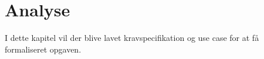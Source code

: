 \chapter{Analyse}

I dette kapitel vil der blive lavet kravspecifikation og use case for at få formaliseret opgaven.


